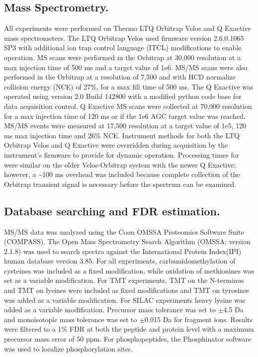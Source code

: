 \subsection{Mass Spectrometry.}
All experiments were performed on Thermo LTQ Orbitrap Velos and Q Exactive mass spectrometers. The LTQ Orbitrap Velos used firmware version 2.6.0.1065 SP3 with additional ion trap control language (ITCL) modifications to enable \inseq{} operation. MS scans were performed in the Orbitrap at 30,000 resolution at a max injection time of 500 ms and a target value of 1e6. MS/MS scans were also performed in the Orbitrap at a resolution of 7,500 and with HCD normalize collision energy (NCE) of 27\%, for a max fill time of 500 ms. The Q Exactive was operated using version 2.0 Build 142800 with a modified python code base for \inseq{} data acquisition control. Q Exactive MS scans were collected at 70,000 resolution for a max injection time of 120 ms or if the 1e6 AGC target value was reached. MS/MS events were measured at 17,500 resolution at a target value of 1e5, 120 ms max injection time and 26\% NCE. Instrument methods for both the LTQ Orbitrap Velos and Q Exactive were overridden during acquisition by the instrument's firmware to provide for dynamic \inseq{} operation. Processing times for \inseq{} were similar on the older Velos-Orbitrap system with the newer Q Exactive; however, a \textasciitilde100 ms overhead was included because complete collection of the Orbitrap transient signal is necessary before the spectrum can be examined.

\subsection{Database searching and FDR estimation.}
MS/MS data was analyzed using the Coon OMSSA Proteomics Software Suite (COMPASS).\cite{compass} The Open Mass Spectrometry Search Algorithm (OMSSA; version 2.1.8) was used to search spectra against the International Protein Index(IPI) human database version 3.85.\cite{omssa} For all experiments, carbamidomethylation of cysteines was included as a fixed modification, while oxidation of methionines was set as a variable modification. For TMT experiments, TMT on the N-terminus and TMT on lysines were included as fixed modifications and TMT on tyrosines was added as a variable modification. For SILAC experiments heavy lysine was added as a variable modification. Precursor mass tolerance was set to $\pm$4.5 Da and monoisotopic mass tolerance was set to $\pm$0.015 Da for fragment ions. Results were filtered to a 1\% FDR at both the peptide and protein level with a maximum precursor mass error of 50 ppm. For phosphopeptides, the Phosphinator software was used to localize phosphorylation sites.\cite{esips}

